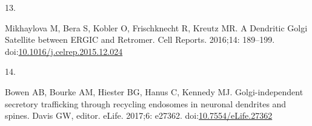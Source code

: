\documentclass[
  12pt,
  a4paper,
]{article}
\newlength{\cslhangindent}
\newlength{\csllabelwidth}
\newlength{\cslentryspacingunit} %
\newenvironment{CSLReferences}[2] %
 {%
  \setlength{\parindent}{0pt}
  \ifodd #1
  \let\oldpar\par
  \def\par{\hangindent=\cslhangindent\oldpar}
  \fi
  \setlength{\parskip}{#2\cslentryspacingunit}
 }%
 {}
\newcommand{\CSLLeftMargin}[1]{\parbox[t]{\csllabelwidth}{#1}}
\newcommand{\CSLRightInline}[1]{\parbox[t]{\linewidth - \csllabelwidth}{#1}\break}
\begin{document}
\begin{CSLReferences}{0}{0}
\leavevmode{}%
\CSLLeftMargin{13. }%
\CSLRightInline{Mikhaylova M, Bera S, Kobler O, Frischknecht R, Kreutz
MR. A {Dendritic Golgi Satellite} between {ERGIC} and {Retromer}. Cell
Reports. 2016;14: 189--199.
doi:\href{https://doi.org/10.1016/j.celrep.2015.12.024}{10.1016/j.celrep.2015.12.024}}

\leavevmode{}%
\CSLLeftMargin{14. }%
\CSLRightInline{Bowen AB, Bourke AM, Hiester BG, Hanus C, Kennedy MJ.
Golgi-independent secretory trafficking through recycling endosomes in
neuronal dendrites and spines. Davis GW, editor. eLife. 2017;6: e27362.
doi:\href{https://doi.org/10.7554/eLife.27362}{10.7554/eLife.27362}}

\end{CSLReferences}
\end{document}
